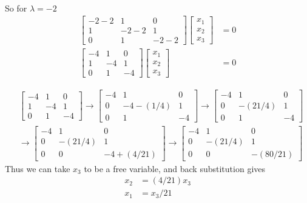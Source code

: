 \documentclass{article}
\begin{document}
\begin{solution}
\paragraph{}
So for $\lambda=-2$
\begin{align*}
\begin{bmatrix}
-2-2	&	1	&	0\\
1	&	-2-2	&	1\\
0	&	1	&	-2-2
\end{bmatrix}
\begin{bmatrix}
x_{1}\\
x_{2}\\
x_{3}
\end{bmatrix}
&= 0\\
\begin{bmatrix}
-4	&	1	&	0\\
1	&	-4	&	1\\
0	&	1	&	-4
\end{bmatrix}
\begin{bmatrix}
x_{1}\\
x_{2}\\
x_{3}
\end{bmatrix}
&= 0
\end{align*}

\begin{align*}
&\begin{bmatrix}
-4	&	1	&	0\\
1	&	-4	&	1\\
0	&	1	&	-4
\end{bmatrix}
\to
\begin{bmatrix}
-4	&	1			&	0\\
0	&	-4-(1/4)	&	1\\
0	&	1			&	-4
\end{bmatrix}
\to
\begin{bmatrix}
-4	&	1		&	0\\
0	&	-(21/4)	&	1\\
0	&	1		&	-4
\end{bmatrix}
\\
&\to
\begin{bmatrix}
-4	&	1		&	0\\
0	&	-(21/4)	&	1\\
0	&	0		&	-4+(4/21)
\end{bmatrix}
\to
\begin{bmatrix}
-4	&	1		&	0\\
0	&	-(21/4)	&	1\\
0	&	0		&	-(80/21)
\end{bmatrix}
\end{align*}
Thus we can take $x_{3}$ to be a free variable, and back substitution gives
\begin{align*}
x_{2} &= (4/21)x_{3}\\
x_{1} &= x_{3}/21
\end{align*}


\end{solution}
\end{document}
